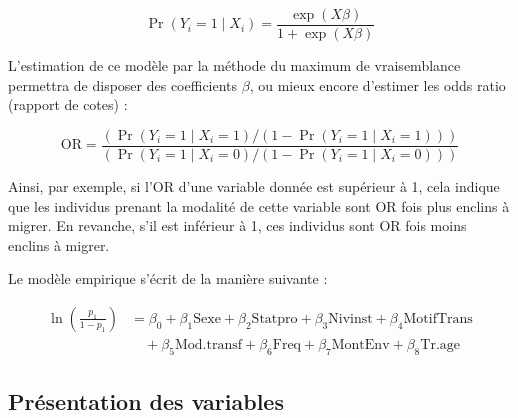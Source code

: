 \documentclass[a4paper,12pt]{article}
\begin{document}
\begin{equation}
\Pr(Y_i = 1 \mid X_i) = \frac{\exp(X \beta)}{1 + \exp(X \beta)}
\end{equation}

L’estimation de ce modèle par la méthode du maximum de vraisemblance permettra de disposer des coefficients $\beta$, ou mieux encore d’estimer les odds ratio (rapport de cotes) :

\begin{equation}
\text{OR} = \frac{\left( \Pr(Y_i = 1 \mid X_i = 1) / (1 - \Pr(Y_i = 1 \mid X_i = 1)) \right)}{\left( \Pr(Y_i = 1 \mid X_i = 0) / (1 - \Pr(Y_i = 1 \mid X_i = 0)) \right)}
\end{equation}

Ainsi, par exemple, si l'OR d’une variable donnée est supérieur à 1, cela indique que les individus prenant la modalité de cette variable sont OR fois plus enclins à migrer. En revanche, s’il est inférieur à 1, ces individus sont OR fois moins enclins à migrer.

Le modèle empirique s’écrit de la manière suivante :


\begin{equation}
\begin{aligned}
    \ln\left(\frac{p_1}{1 - p_1}\right) &= \beta_0 + \beta_1 \text{Sexe} + \beta_2 \text{Statpro} + \beta_3 \text{Nivinst} + \beta_4 \text{MotifTrans} \\
    &\quad + \beta_5 \text{Mod.transf} + \beta_6 \text{Freq} + \beta_7 \text{MontEnv} + \beta_8 \text{Tr.age}
\end{aligned}
\end{equation}


\newpage

\subsection{Présentation des variables}
\end{document}
